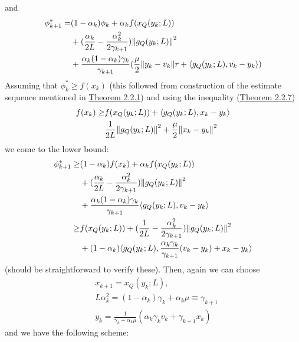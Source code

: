 \documentclass[12pt,a4paper]{article}
\begin{document}
		and 
		\begin{align*}
		\phi_{k+1}^* = &(1 - \alpha_k)\phi_k + \alpha_k f(x_Q(y_k;L)) \\
		&+ (\frac{\alpha_k}{2L} - \frac{\alpha_k^2}{2\gamma_{k+1}})\norm{g_Q(y_k;L)}^2 \\
			&+ \frac{\alpha_k(1 - \alpha_k)\gamma_k}{\gamma_{k+1}}(\frac{\mu}{2}\norm{y_k - v_k}^^2 + \langle g_Q(y_k;L),v_k - y_k \rangle)
	\end{align*}
	Assuming that $\phi_k^* \geq f(x_k)$  (this followed from construction of the estimate sequence mentioned in \hyperref[thm221]{Theorem 2.2.1}) and using the inequality (\hyperref[thm227]{Theorem 2.2.7})
	\begin{align*}
		f(x_k) \geq &f(x_Q(y_k;L)) + \langle g_Q(y_k;L), x_k - y_k \rangle \\
		& \frac{1}{2L}\norm{g_Q(y_k;L)}^2 + \frac{\mu}{2}\norm{x_k - y_k}^2
	\end{align*}
	we come to the lower bound:
	\begin{align*}
		\phi_{k+1}^* \geq &(1 - \alpha_k)f(x_k) + \alpha_kf(x_Q(y_k;L)) \\
		&+ (\frac{\alpha_k}{2L} - \frac{\alpha_k^2}{2\gamma_{k+1}})\norm{g_Q(y_k;L)}^2 \\
		&+ \frac{\alpha_k(1 - \alpha_k)\gamma_k}{\gamma_{k+1}} \langle g_Q(y_k;L), v_k - y_k \rangle \\
		\geq  &f(x_Q(y_k;L)) + (\frac{1}{2L} - \frac{\alpha_k^2}{2\gamma_{k+1}}) \norm{g_Q(y_k;L)}^2 \\
		&+(1 - \alpha_k)\langle g_Q(y_k;L), \frac{\alpha_k\gamma_k}{\gamma_{k+1}}(v_k - y_k) + x_k - y_k \rangle 
	\end{align*}
	(should be straightforward to verify these). Then, again we can choose
	\begin{align*}
		&x_{k+1} = x_Q(y_k;L), \\
		&L\alpha_k^2 = (1 - \alpha_k)\gamma_k + \alpha_k\mu \equiv \gamma_{k+1} \\
		&y_k = \frac{1}{\gamma_k + \alpha_k\mu}(\alpha_k\gamma_kv_k + \gamma_{k+1}x_k)
	\end{align*}
	and we have the following scheme:
\end{document}

